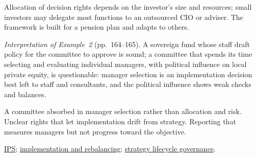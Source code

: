 \begin{qfdefinition}
 Allocation of decision rights depends on the investor's size and resources; small investors may delegate most functions to an outsourced CIO or adviser. The framework is built for a pension plan and adapts to others.

 \emph{Interpretation of Example~2} (pp.~164--165). A sovereign fund whose staff draft policy for the committee to approve is sound; a committee that spends its time selecting and evaluating individual managers, with political influence on local private equity, is questionable: manager selection is an implementation decision best left to staff and consultants, and the political influence shows weak checks and balances.

 A committee absorbed in manager selection rather than allocation and risk. Unclear rights that let implementation drift from strategy. Reporting that measures managers but not progress toward the objective.

 \hyperref[meth:investment-policy-statement]{IPS}; \hyperref[meth:allocation-implementation-rebalancing]{implementation and rebalancing}; \hyperref[meth:strategy-production-lifecycle]{strategy lifecycle governance}.

\end{qfdefinition}

